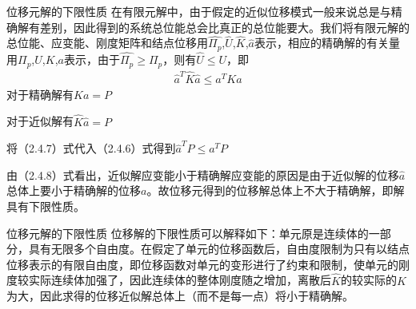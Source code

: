 \documentclass[11pt]{beamer}
\begin{document}
\begin{frame}{位移元解的下限性质}
在有限元解中，由于假定的近似位移模式一般来说总是与精确解有差别，因此得到的系统总位能总会比真正的总位能要大。我们将有限元解的总位能、应变能、刚度矩阵和结点位移用$\widehat{\Pi_{p}}$,$\widehat{U}$,$\widehat{K}$,$\widehat{a}$表示，相应的精确解的有关量用$\Pi_{p}$,$U$,$K$,$a$表示，由于$\widehat{\Pi_{p}}\ge\Pi_{p}$，则有$\widehat{U}\le U$，即
\begin{align*}
\widehat{a}^{T}\widehat{K}\widehat{a}\le a^{T}Ka
\end{align*}
对于精确解有$Ka=P$
\par
对于近似解有$\widehat{K}\widehat{a}=P$    
\par
将（2.4.7）式代入（2.4.6）式得到$\widehat{a}^{T}P \le a^{T}P$
\par
由（2.4.8）式看出，近似解应变能小于精确解应变能的原因是由于近似解的位移$\widehat{a}$总体上要小于精确解的位移$a$。故位移元得到的位移解总体上不大于精确解，即解具有下限性质。

\end{frame}

\begin{frame}{位移元解的下限性质}
位移解的下限性质可以解释如下：单元原是连续体的一部分，具有无限多个自由度。在假定了单元的位移函数后，自由度限制为只有以结点位移表示的有限自由度，即位移函数对单元的变形进行了约束和限制，使单元的刚度较实际连续体加强了，因此连续体的整体刚度随之增加，离散后$\widehat{K}$的较实际的$K$为大，因此求得的位移近似解总体上（而不是每一点）将小于精确解。
\end{frame}
%
%
%
\end{document}
